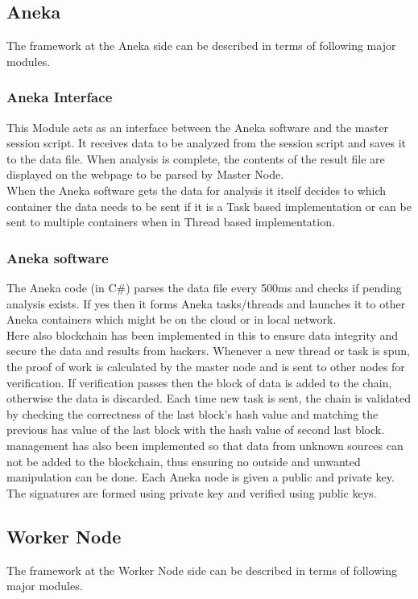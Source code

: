 \documentclass[AMA,STIX1COL]{WileyNJD-v2}
\begin{document}
\subsection{Aneka}
The framework at the Aneka side can be described in terms of following major modules.

\subsubsection{Aneka Interface}
This Module acts as an interface between the Aneka software and the master session script. It receives data to be analyzed from the session script and saves it to the data file. When analysis is complete, the contents of the result file are displayed on the webpage to be parsed by Master Node.\\ 
When the Aneka software gets the data for analysis it itself decides to which container the data needs to be sent if it is a Task based implementation or can be sent to multiple containers when in Thread based implementation. 

\subsubsection{Aneka software}
The Aneka code (in C\#) parses the data file every 500ms and checks if pending analysis exists. If yes then it forms Aneka tasks/threads and launches it to other Aneka containers which might be on the cloud or in local network. \\
Here also blockchain has been implemented in this to ensure data integrity and secure the data and results from hackers. Whenever a new thread or task is spun, the proof of work is calculated by the master node and is sent to other nodes for verification. If verification passes then the block of data is added to the chain, otherwise the data is discarded. Each time new task is sent, the chain is validated by checking the correctness of the last block’s hash value and matching the previous has value of the last block with the hash value of second last block. \\
management has also been implemented so that data from unknown sources can not be added to the blockchain, thus ensuring no outside and unwanted manipulation can be done. Each Aneka node is given a public and private key. The signatures are formed using private key and verified using public keys. 

\subsection{Worker Node}
The framework at the Worker Node side can be described in terms of following major modules.
\end{document}
